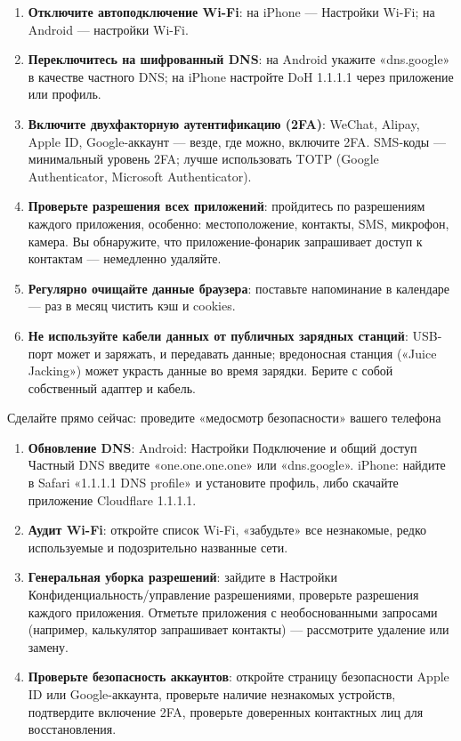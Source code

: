 \begin{enumerate}
  \item \textbf{Отключите автоподключение Wi-Fi}: на iPhone — Настройки Wi-Fi; на Android — настройки Wi-Fi.
  \item \textbf{Переключитесь на шифрованный DNS}: на Android укажите «dns.google» в качестве частного DNS; на iPhone настройте DoH 1.1.1.1 через приложение или профиль.
  \item \textbf{Включите двухфакторную аутентификацию (2FA)}: WeChat, Alipay, Apple ID, Google-аккаунт — везде, где можно, включите 2FA. SMS-коды — минимальный уровень 2FA; лучше использовать TOTP (Google Authenticator, Microsoft Authenticator).
  \item \textbf{Проверьте разрешения всех приложений}: пройдитесь по разрешениям каждого приложения, особенно: местоположение, контакты, SMS, микрофон, камера. Вы обнаружите, что приложение-фонарик запрашивает доступ к контактам — немедленно удаляйте.
  \item \textbf{Регулярно очищайте данные браузера}: поставьте напоминание в календаре — раз в месяц чистить кэш и cookies.
  \item \textbf{Не используйте кабели данных от публичных зарядных станций}: USB-порт может и заряжать, и передавать данные; вредоносная станция («Juice Jacking») может украсть данные во время зарядки. Берите с собой собственный адаптер и кабель.
\end{enumerate}

\begin{tcbpractice}{Сделайте прямо сейчас: проведите «медосмотр безопасности» вашего телефона}
\begin{enumerate}
  \item \textbf{Обновление DNS}: Android: Настройки Подключение и общий доступ Частный DNS введите «one.one.one.one» или «dns.google». iPhone: найдите в Safari «1.1.1.1 DNS profile» и установите профиль, либо скачайте приложение Cloudflare 1.1.1.1.
  \item \textbf{Аудит Wi-Fi}: откройте список Wi-Fi, «забудьте» все незнакомые, редко используемые и подозрительно названные сети.
  \item \textbf{Генеральная уборка разрешений}: зайдите в Настройки Конфиденциальность/управление разрешениями, проверьте разрешения каждого приложения. Отметьте приложения с необоснованными запросами (например, калькулятор запрашивает контакты) — рассмотрите удаление или замену.
  \item \textbf{Проверьте безопасность аккаунтов}: откройте страницу безопасности Apple ID или Google-аккаунта, проверьте наличие незнакомых устройств, подтвердите включение 2FA, проверьте доверенных контактных лиц для восстановления.
\end{enumerate}

\end{tcbpractice}
